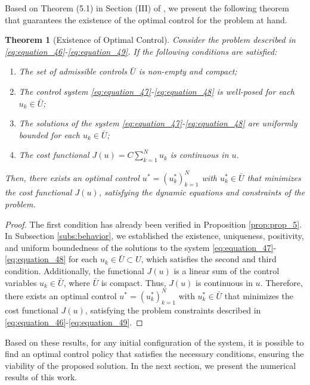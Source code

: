 \documentclass[10pt,letterpaper]{article}
\newtheorem{theorem}{Theorem}
\begin{document}
Based on Theorem (5.1) in Section (III) of \cite{berkovitz2013optimal}, we present the following theorem that guarantees the existence of the optimal control for the problem at hand.
\begin{theorem}[Existence of Optimal Control]\label{thm:thm_7}
    Consider the problem described in \eqref{eq:equation_46}-\eqref{eq:equation_49}. If the following conditions are satisfied:
\begin{enumerate}
    \item The set of admissible controls $ \bar{U} $ is non-empty and compact;
    \item The control system \eqref{eq:equation_47}-\eqref{eq:equation_48} is well-posed for each $ u_k \in \bar{U} $;
    \item The solutions of the system \eqref{eq:equation_47}-\eqref{eq:equation_48} are uniformly bounded for each $ u_k \in \bar{U} $;
    \item The cost functional $ J(u) = C \sum_{k=1}^{N} u_k $ is continuous in $ u $.
\end{enumerate}
Then, there exists an optimal control $ u^* = (u^*_k)_{k=1}^{N} $ with $ u^*_k \in \bar{U} $ that minimizes the cost functional $ J(u) $, satisfying the dynamic equations and constraints of the problem.
\end{theorem} 
\begin{proof}
    The first condition has already been verified in Proposition \eqref{prop:prop_5}. In Subsection \eqref{subs:behavior}, we established the existence, uniqueness, positivity, and uniform boundedness of the solutions to the system \eqref{eq:equation_47}-\eqref{eq:equation_48} for each $ u_k \in \bar{U} \subset U $, which satisfies the second and third condition. Additionally, the functional $ J(u) $ is a linear sum of the control variables $ u_k \in \bar{U} $, where $ \bar{U} $ is compact. Thus, $ J(u) $ is continuous in $ u $. Therefore, there exists an optimal control $ u^* = (u^*_k)_{k=1}^{N}$ with $ u^*_k \in \bar{U} $ that minimizes the cost functional $ J(u) $, satisfying the problem constraints described in \eqref{eq:equation_46}-\eqref{eq:equation_49}.
\end{proof}

Based on these results, for any initial configuration of the system, it is possible to find an optimal control policy that satisfies the necessary conditions, ensuring the viability of the proposed solution. In the next section, we present the numerical results of this work.
\end{document}
